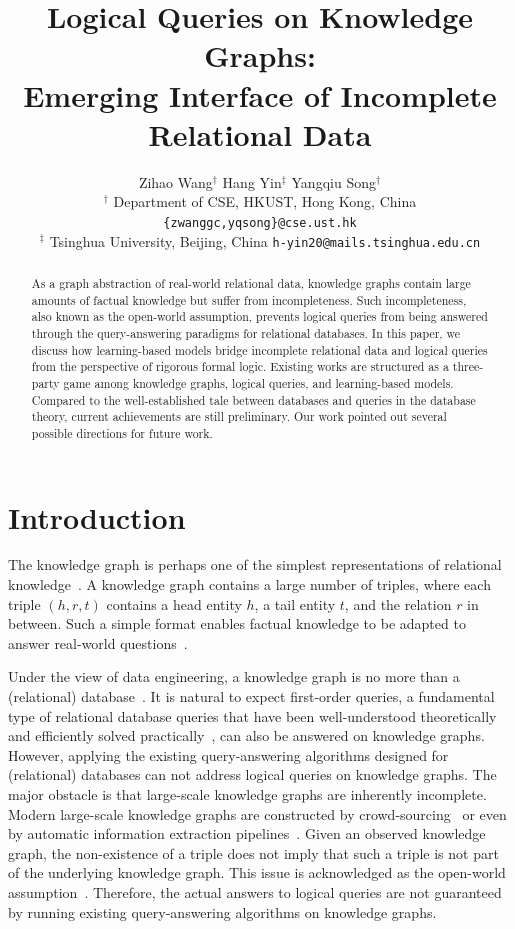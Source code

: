 \documentclass[11pt]{article}
\title{Logical Queries on Knowledge Graphs: \\ Emerging Interface of Incomplete
Relational Data}
\author{Zihao Wang$^{\dagger}$
\hspace{2em} Hang Yin$^{\ddagger}$
\hspace{2em} Yangqiu Song$^{\dagger}$ \\
$^{\dagger}$ Department of CSE, HKUST, Hong Kong, China \hspace{1em}
\texttt{\small\{zwanggc,yqsong\}@cse.ust.hk}\\
$^{\ddagger}$ Tsinghua University, Beijing, China \hspace{1em} \texttt{\small h-yin20@mails.tsinghua.edu.cn}}
\begin{document}
\maketitle
\begin{abstract}
As a graph abstraction of real-world relational data, knowledge graphs contain large amounts of factual knowledge but suffer from incompleteness. Such incompleteness, also known as the open-world assumption, prevents logical queries from being answered through the query-answering paradigms for relational databases. In this paper, we discuss how learning-based models bridge incomplete relational data and logical queries from the perspective of rigorous formal logic. Existing works are structured as a three-party game among knowledge graphs, logical queries, and learning-based models. Compared to the well-established tale between databases and queries in the database theory, current achievements are still preliminary. Our work pointed out several possible directions for future work.
\end{abstract}

\section{Introduction}
The knowledge graph is perhaps one of the simplest representations of relational knowledge~\cite{Bollacker2008Freebasecollaboratively,Vrandecic2014Wikidatafree,PellissierTanon2016FreebaseWikidata}. A knowledge graph contains a large number of triples, where each triple $(h, r, t)$ contains a head entity $h$, a tail entity $t$, and the relation $r$ in between. Such a simple format enables factual knowledge to be adapted to answer real-world questions~\cite{Sun2022JointLKJoint,Yasunaga2021QAGNNReasoning,Saxena2021QuestionAnswering,Ren2021LEGOLatent,Lin2019KagNetKnowledgeAware}.

Under the view of data engineering, a knowledge graph is no more than a (relational) database~\cite{abiteboul1995FoundationsDatabases}. It is natural to expect first-order queries, a fundamental type of relational database queries that have been well-understood theoretically~\cite{Libkin2004ElementsFinite} and efficiently solved practically~\cite{Kroenke2018Databaseprocessing}, can also be answered on knowledge graphs. However, applying the existing query-answering algorithms designed for (relational) databases can not address logical queries on knowledge graphs.
The major obstacle is that large-scale knowledge graphs are inherently incomplete. Modern large-scale knowledge graphs are constructed by crowd-sourcing~\cite{Vrandecic2014Wikidatafree} or even by automatic information extraction pipelines~\cite{Carlson2010ArchitectureNeverEnding}.  Given an observed knowledge graph, the non-existence of a triple does not imply that such a triple is not part of the underlying knowledge graph. This issue is acknowledged as the open-world assumption~\cite{Libkin2009OpenClosed}.
Therefore, the actual answers to logical queries are not guaranteed by running existing query-answering algorithms on knowledge graphs.
\end{document}
